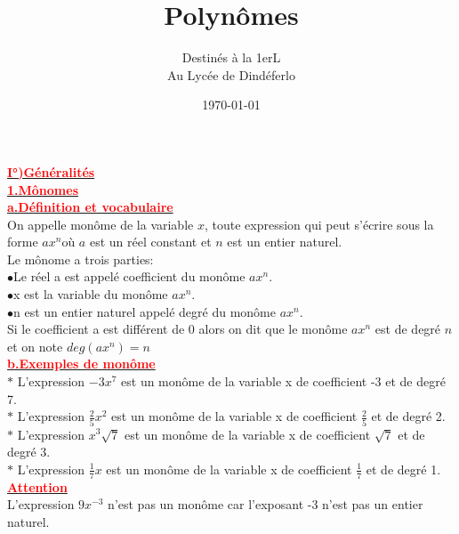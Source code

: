 \documentclass[12pt]{article}
\author{Destinés à la 1erL\\Au Lycée de Dindéferlo}
\title{\textbf{Polynômes}}
\date{\today}
\begin{document}
\maketitle
\newpage


\underline{\textbf{\textcolor{red}{I°)Généralités}}}\\
\underline{\textbf{\textcolor{red}{1.Mônomes}}}\\
\underline{\textbf{\textcolor{red}{a.Définition et vocabulaire}}}\\
On appelle monôme de la variable $x$, toute expression qui peut s'écrire sous la forme $ax^{n}$où $a$ est un réel constant et $n$ est un entier naturel.\\
Le mônome a trois parties:\\
$\bullet$Le réel a est appelé coefficient du monôme $ax^{n}$.\\
$\bullet$x est la variable du monôme $ax^{n}$.\\
$\bullet$n est un entier naturel appelé degré du monôme $ax^{n}$.\\
Si le coefficient a est différent de 0 alors on dit que le monôme $ax^{n}$ est de degré $n$ et on note $deg(ax^{n})=n$ \\
\underline{\textbf{\textcolor{red}{b.Exemples de monôme}}}\\
$\ast$ L'expression $-3x^{7}$ est un monôme de la variable x de coefficient -3 et de degré 7.\\
$\ast$ L'expression $\frac{2}{5}x^{2}$ est un monôme de la variable x de coefficient $\frac{2}{5}$ et de degré 2.\\
$\ast$ L'expression $x^{3} \sqrt{7} $ est un monôme de la variable x de coefficient $\sqrt{7}$ et de degré 3.\\
$\ast$ L'expression $\frac{1}{7}x$ est un monôme de la variable x de coefficient $\frac{1}{7}$  et de degré 1.\\
\underline{\textbf{\textcolor{red}{Attention}}}\\L'expression $9x^{-3}$ n'est pas un monôme car l'exposant -3 n'est pas un entier naturel.\\
\end{document}
